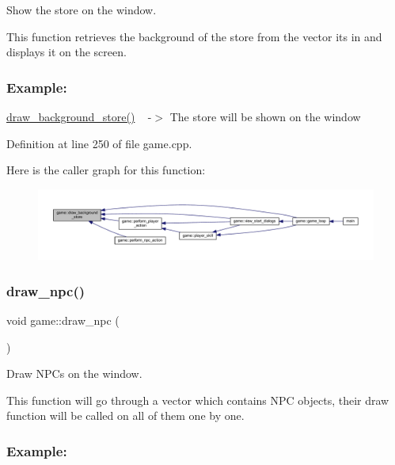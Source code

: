 Show the store on the window. 

This function retrieves the background of the store from the vector it\textquotesingle{}s in and displays it on the screen.~\newline


\subsubsection*{Example\+: }

\hyperlink{classgame_a4cf9147e06874edfc6190db64d719dec}{draw\+\_\+background\+\_\+store()} ~\newline
-\/$>$ The store will be shown on the window 

Definition at line 250 of file game.\+cpp.

Here is the caller graph for this function\+:
\nopagebreak
\begin{figure}[H]
\begin{center}
\leavevmode
\includegraphics[width=350pt]{classgame_a4cf9147e06874edfc6190db64d719dec_icgraph}
\end{center}
\end{figure}
\mbox{\label{classgame_a961fe8a42a2c0bc1ef62ef17c7c64f06}} 
\subsubsection{\texorpdfstring{draw\+\_\+npc()}{draw\_npc()}}
{\footnotesize\ttfamily void game\+::draw\+\_\+npc (\begin{DoxyParamCaption}{ }\end{DoxyParamCaption})\hspace{0.3cm}{\ttfamily [private]}}



Draw N\+PC\textquotesingle{}s on the window. 

This function will go through a vector which contains N\+PC objects, their draw function will be called on all of them one by one.~\newline


\subsubsection*{Example\+: }

